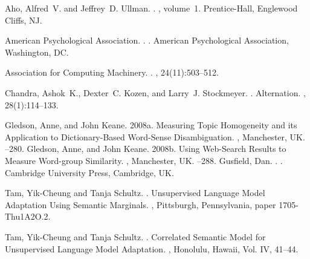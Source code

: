 \documentclass[11pt]{article}
\begin{document}
\begin{thebibliography}{}

Aho, Alfred~V. and Jeffrey~D. Ullman.
.
, volume~1.
\newblock Prentice-{Hall}, Englewood Cliffs, NJ.

{American Psychological Association}.
.
.
\newblock American Psychological Association, Washington, DC.

{Association for Computing Machinery}.
.
, 24(11):503--512.

Chandra, Ashok~K., Dexter~C. Kozen, and Larry~J. Stockmeyer.
.
\newblock Alternation.
,
  28(1):114--133.

Gledson, Anne, and John Keane. 
\newblock 2008a. 
\newblock Measuring Topic Homogeneity and its Application to Dictionary-Based Word-Sense Disambiguation. 
, Manchester, UK.
--280.
Gledson, Anne, and John Keane. 
\newblock 2008b. 
\newblock Using Web-Search Results to Measure Word-group Similarity. , Manchester, UK.
--288.
Gusfield, Dan.
.
.
\newblock Cambridge University Press, Cambridge, UK.

Tam, Yik-Cheung and Tanja Schultz.
. 
\newblock Unsupervised Language Model Adaptation Using
   Semantic Marginals.
, 
Pittsburgh, Pennsylvania, paper 1705-Thu1A2O.2. 

Tam, Yik-Cheung and Tanja Schultz.
.
\newblock Correlated  Semantic Model for
  Unsupervised Language Model Adaptation.
, Honolulu, Hawaii, Vol. IV, 41--44.

\end{thebibliography}
\end{document}
